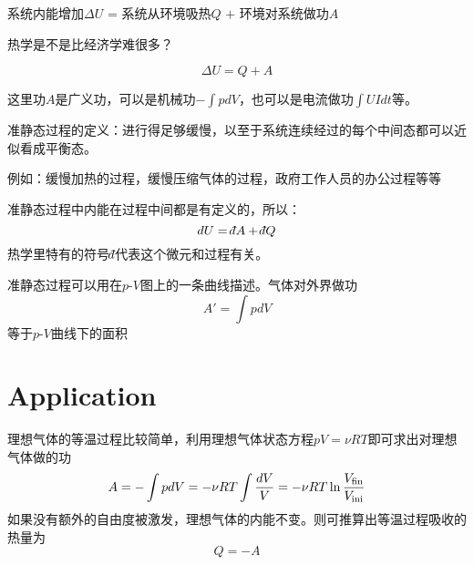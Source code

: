 \documentclass[CJK]{beamer}
\begin{document}
\begin{frame}
\bch
\tbox
{\small 系统内能增加$\Delta U$ = 系统从环境吸热$Q$ $+$ 环境对系统做功$A$}
\ech
\end{frame}

\begin{frame}
\bch

\huaixiao 热学是不是比经济学难很多？
\ech
\end{frame}


\begin{frame}
\bch
$$ \Delta U =  Q + A $$

\skiplines

这里功$A$是{\blue 广义功}，可以是机械功$-\int pdV$，也可以是电流做功$\int UIdt$等。
\ech
\end{frame}

\begin{frame}
\bch
准静态过程的定义：{\blue 进行得足够缓慢，以至于系统连续经过的每个中间态都可以近似看成平衡态。}

\skiplines

{\small 例如：缓慢加热的过程，缓慢压缩气体的过程，政府工作人员的办公过程等等}


\ech
\end{frame}


\begin{frame}
\bch
准静态过程中内能在过程中间都是有定义的，所以：
{\blue
$$dU = \dbar A + \dbar Q$$
}
热学里特有的符号$\dbar$代表这个微元和过程有关。

\ech
\end{frame}


\begin{frame}
\bch
准静态过程可以用在$p$-$V$图上的一条曲线描述。气体对外界做功
$$ A' = \int p dV $$
等于$p$-$V$曲线下的面积

\ech
\end{frame}

\section{Application}

\begin{frame}
\bch
理想气体的等温过程比较简单，利用理想气体状态方程$pV = \nu RT$即可求出对理想气体做的功
$$ A = -\int p dV = -\nu R T \int \frac{dV}{V} =- \nu R T\ln\frac{V_{\rm fin}}{V_{\rm ini}}$$
如果没有额外的自由度被激发，理想气体的内能不变。则可推算出等温过程吸收的热量为
$$ Q = - A $$
\ech
\end{frame}
\end{document}
